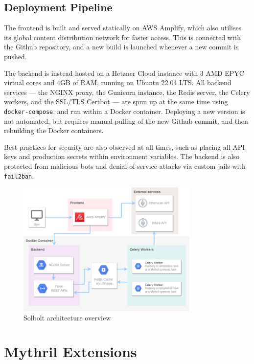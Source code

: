 \subsection{Deployment Pipeline}

The frontend is built and served statically on AWS Amplify, which also utilises its global content
distribution network for faster access. This is connected with the Github repository, and a new build
is launched whenever a new commit is pushed.

The backend is instead hosted on a Hetzner Cloud instance 
with 3 AMD EPYC virtual cores and 4GB of RAM, running on Ubuntu 22.04 LTS. All backend services ---
the NGINX proxy, the Gunicorn instance, the Redis server, the Celery workers, and the SSL/TLS Certbot ---
are spun up at the same time using \texttt{docker-compose}, and run within a Docker container.
Deploying a new version is not automated, but requires manual pulling of the new Github commit, and
then rebuilding the Docker containers.

Best practices for security are also observed at all times, such as placing all API keys and
production secrets within environment variables. The backend is also protected from malicious
bots and denial-of-service attacks via custom jails with \texttt{fail2ban}.

\begin{figure}[h]
  \centering
  \includegraphics[width=0.8\textwidth]{./figures/implementation/architecture}
  \caption{Solbolt architecture overview}
  \label{fig:solbolt_architecture}
\end{figure}

\section{Mythril Extensions}

